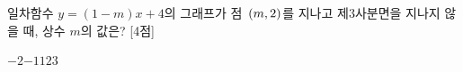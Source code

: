 일차함수 $y=(1-m)x+4$의 그래프가 점~$(m{,}\mkern3mu 2)$를 지나고 제$3$사분면을 지나지 않을 때, 상수 $m$의 값은? \mbox{[4점]}
\begin{choices32}{$-2$}{$-1$}{$1$}{$2$}{$3$}\end{choices32}
